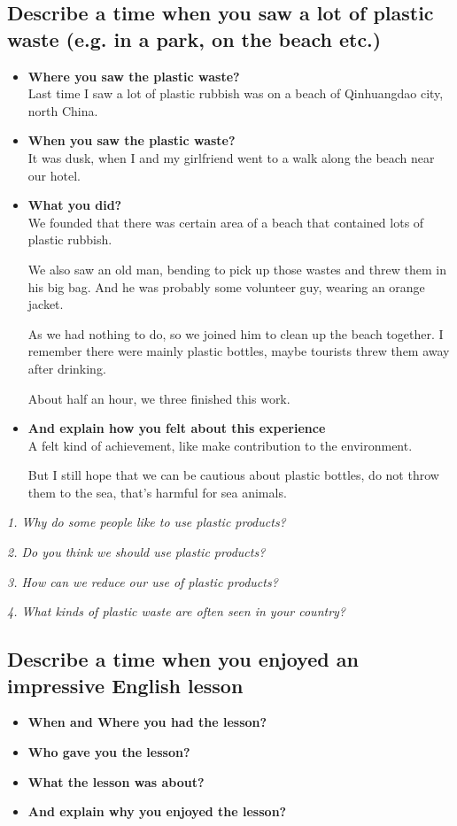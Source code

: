 \documentclass[conference]{IEEEtran}
\begin{document}
\subsection{Describe a time when you saw a lot of plastic waste (e.g. in a park, on the beach
etc.)}
\begin{itemize}
    \item \textbf{Where you saw the plastic waste?}\\
    Last time I saw a lot of plastic rubbish was on a beach of Qinhuangdao city, north China.
    \item \textbf{When you saw the plastic waste?}\\
    It was dusk, when I and my girlfriend  went to a walk along the beach near our hotel.
    \item \textbf{What you did?}\\
    We founded that there was certain area of a beach that contained lots of plastic rubbish.

    We also saw an old man, bending to pick up those wastes and threw them in his big bag.
    And he was probably some volunteer guy, wearing an orange jacket.

    As we had nothing to do, so we joined him to clean up the beach together.
    I remember there were mainly plastic bottles, maybe tourists threw them away after drinking.

    About half an hour, we three finished this work.
    \item \textbf{And explain how you felt about this experience}\\
    A felt kind of achievement, like make contribution to the environment.

    But I still hope that we can be cautious about plastic bottles, do not throw them to the sea, that's
    harmful for sea animals.
\end{itemize}

\textit{1. Why do some people like to use plastic products?}

\textit{2. Do you think we should use plastic products?}

\textit{3. How can we reduce our use of plastic products?}

\textit{4. What kinds of plastic waste are often seen in your country?}

\subsection{Describe a time when you enjoyed an impressive English lesson}
\begin{itemize}
    \item \textbf{When and Where you had the lesson?}
    \item \textbf{Who gave you the lesson?}
    \item \textbf{What the lesson was about?}
    \item \textbf{And explain why you enjoyed the lesson?}
\end{itemize}
\end{document}
